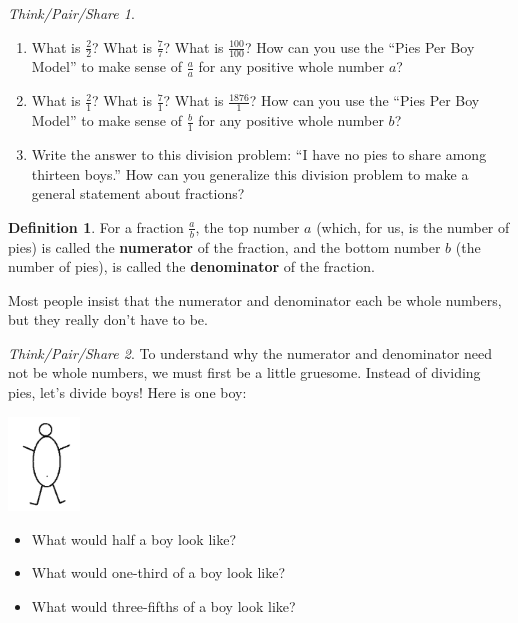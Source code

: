 \documentclass[10pt, reqno]{amsart}
\theoremstyle{remark}
\newtheorem*{thinkpair*}{Think/Pair/Share}
\theoremstyle{definition}
\newtheorem{define}[thm]{Definition}
\numberwithin{equation}{section}  %
\begin{document}
\begin{thinkpair*}\ 

\begin{enumerate}
\item
What is $\frac 2 2$?  What is $\frac 7 7 $?  What is $\frac{100}{100}$?  How can you use the ``Pies Per Boy Model'' to make sense of $\frac a a$ for any positive whole number $a$?\\

\item
What is $\frac 2 1$?  What is $\frac 7 1 $?  What is $\frac{1876}{1}$?  How can you use the ``Pies Per Boy Model'' to make sense of $\frac b 1$ for any positive whole number $b$?\\

\item
Write the answer to this division problem: ``I have no pies to share among thirteen boys.''  How can you generalize this division problem to make a general statement about fractions?

\end{enumerate}

\end{thinkpair*}
 
 \begin{define}
 For a fraction $\frac a b$,
the top number $a$ (which, for us, is the number of pies) is called
the {\bf numerator} of the fraction, and the bottom number $b$ (the number of pies), is called the
{\bf denominator} of the fraction. 
 \end{define}
 
 Most people insist that the numerator and denominator  each be whole
numbers, but they really don't have to be.
 
 
  \begin{thinkpair*}
 To understand why the numerator and denominator need not be whole numbers, we must first  be a little gruesome.  Instead of dividing pies, let's divide boys!  Here is one boy:
  \begin{center}
\includegraphics[height = 2.5cm]{oneboy}
\end{center}

 \begin{itemize}
 \item
 What would half a boy look like?
 
 \item
 What would one-third of a boy look like?
 
 \item
 What would three-fifths of a boy look like?
 \end{itemize}
 
 \end{thinkpair*}
\end{document}
